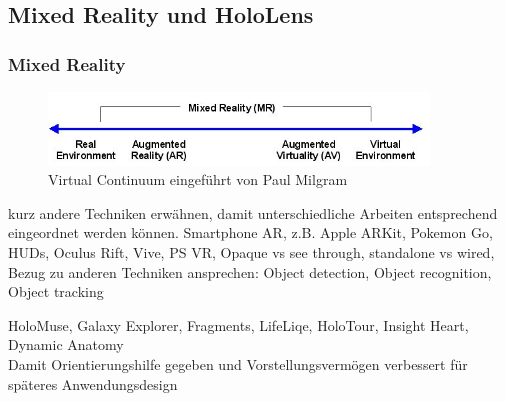 \subsection{Mixed Reality und HoloLens}
\label{sec-2-1}

\subsubsection{Mixed Reality}
\label{sec-2-1-1}

\begin{figure}[h!]
	\centering
	\includegraphics[width=0.9\textwidth]{images/virtual_continuum.png}
	\caption{Virtual Continuum eingeführt von Paul Milgram \cite{Milgram94}}
	\label{img:virtual_continuum}
\end{figure}

kurz andere Techniken erwähnen, damit unterschiedliche Arbeiten entsprechend eingeordnet werden können. Smartphone AR, z.B. Apple ARKit, Pokemon Go, HUDs, Oculus Rift, Vive, PS VR, Opaque vs see through, standalone vs wired, Bezug zu anderen Techniken ansprechen: Object detection, Object recognition, Object tracking

HoloMuse, Galaxy Explorer, Fragments, LifeLiqe, HoloTour, Insight Heart, Dynamic Anatomy\\
Damit Orientierungshilfe gegeben und Vorstellungsvermögen verbessert für späteres Anwendungsdesign

